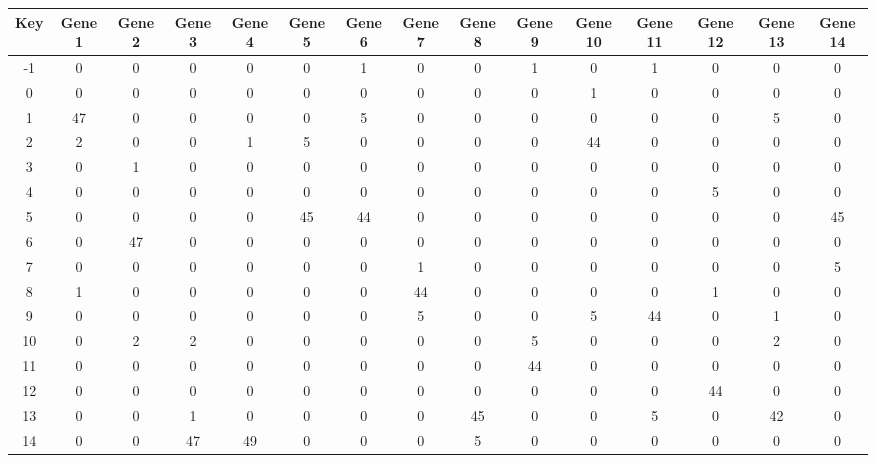 \begin{tabular}{|c|c|c|c|c|c|c|c|c|c|c|c|c|c|c|}
\hline
Key & Gene 1 & Gene 2 & Gene 3 & Gene 4 & Gene 5 & Gene 6 & Gene 7 & Gene 8 & Gene 9 & Gene 10 & Gene 11 & Gene 12 & Gene 13 & Gene 14 \\
\hline
-1 & 0 & 0 & 0 & 0 & 0 & 1 & 0 & 0 & 1 & 0 & 1 & 0 & 0 & 0 \\
0 & 0 & 0 & 0 & 0 & 0 & 0 & 0 & 0 & 0 & 1 & 0 & 0 & 0 & 0 \\
1 & 47 & 0 & 0 & 0 & 0 & 5 & 0 & 0 & 0 & 0 & 0 & 0 & 5 & 0 \\
2 & 2 & 0 & 0 & 1 & 5 & 0 & 0 & 0 & 0 & 44 & 0 & 0 & 0 & 0 \\
3 & 0 & 1 & 0 & 0 & 0 & 0 & 0 & 0 & 0 & 0 & 0 & 0 & 0 & 0 \\
4 & 0 & 0 & 0 & 0 & 0 & 0 & 0 & 0 & 0 & 0 & 0 & 5 & 0 & 0 \\
5 & 0 & 0 & 0 & 0 & 45 & 44 & 0 & 0 & 0 & 0 & 0 & 0 & 0 & 45 \\
6 & 0 & 47 & 0 & 0 & 0 & 0 & 0 & 0 & 0 & 0 & 0 & 0 & 0 & 0 \\
7 & 0 & 0 & 0 & 0 & 0 & 0 & 1 & 0 & 0 & 0 & 0 & 0 & 0 & 5 \\
8 & 1 & 0 & 0 & 0 & 0 & 0 & 44 & 0 & 0 & 0 & 0 & 1 & 0 & 0 \\
9 & 0 & 0 & 0 & 0 & 0 & 0 & 5 & 0 & 0 & 5 & 44 & 0 & 1 & 0 \\
10 & 0 & 2 & 2 & 0 & 0 & 0 & 0 & 0 & 5 & 0 & 0 & 0 & 2 & 0 \\
11 & 0 & 0 & 0 & 0 & 0 & 0 & 0 & 0 & 44 & 0 & 0 & 0 & 0 & 0 \\
12 & 0 & 0 & 0 & 0 & 0 & 0 & 0 & 0 & 0 & 0 & 0 & 44 & 0 & 0 \\
13 & 0 & 0 & 1 & 0 & 0 & 0 & 0 & 45 & 0 & 0 & 5 & 0 & 42 & 0 \\
14 & 0 & 0 & 47 & 49 & 0 & 0 & 0 & 5 & 0 & 0 & 0 & 0 & 0 & 0 \\
\hline
\end{tabular}